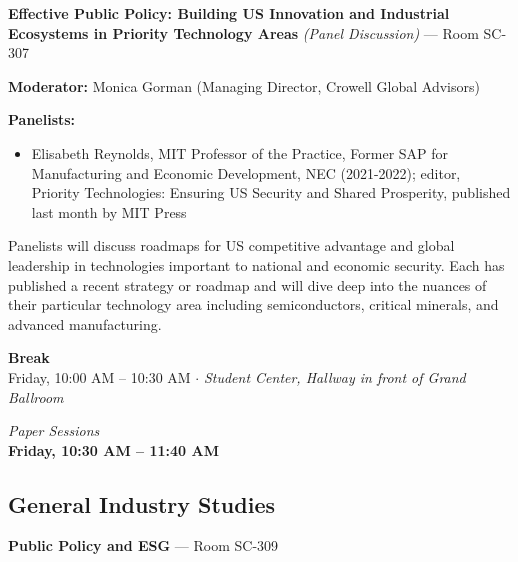 \documentclass[
  10pt,
  letterpaper,
  DIV=11,
  numbers=noendperiod]{scrartcl}
\providecommand{\tightlist}{%
  \setlength{\itemsep}{0pt}\setlength{\parskip}{0pt}}\usepackage{longtable,booktabs,array}
\begin{document}
\textbf{Effective Public Policy: Building US Innovation and Industrial
Ecosystems in Priority Technology Areas} \emph{(Panel Discussion)} ---
Room SC-307

\textbf{Moderator:} Monica Gorman (Managing Director, Crowell Global
Advisors)

\textbf{Panelists:}

\begin{itemize}
\tightlist
\item
  Elisabeth Reynolds, MIT Professor of the Practice, Former SAP for
  Manufacturing and Economic Development, NEC (2021-2022); editor,
  Priority Technologies: Ensuring US Security and Shared Prosperity,
  published last month by MIT Press
\end{itemize}

Panelists will discuss roadmaps for US competitive advantage and global
leadership in technologies important to national and economic security.
Each has published a recent strategy or roadmap and will dive deep into
the nuances of their particular technology area including
semiconductors, critical minerals, and advanced manufacturing.

\vspace{1em}


\begin{center}
\colorbox{event!15}{\parbox{0.9\linewidth}{\centering
  \textcolor{event}{\large\textbf{Break}}\\[2pt]
  {\small Friday, 10:00 AM – 10:30 AM $\cdot$ \textit{Student Center, Hallway in front of Grand Ballroom}}
}}
\end{center}

\vspace{1em}


\begin{center}
\normalsize\textit{Paper Sessions}\\[0.3em]
\Large\textbf{Friday, 10:30 AM – 11:40 AM}
\end{center}

\subsection{\texorpdfstring{\textcolor{gis}{General Industry Studies}}{}}\label{section-53}

\textbf{Public Policy and ESG} --- Room SC-309
\end{document}
